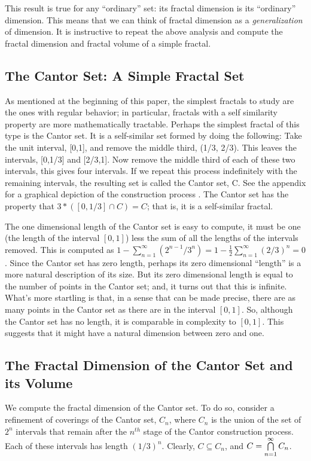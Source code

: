 {This result is true for any ``ordinary'' set: its fractal dimension is its
``ordinary'' dimension. This means that we can think of fractal
dimension as a {\it generalization} of dimension. It is 
instructive to repeat the above analysis and compute the fractal dimension 
and fractal volume of a simple fractal.


\subsection{The Cantor Set: A Simple Fractal Set}

As mentioned at the beginning of this paper, the simplest fractals to
study are the ones with regular behavior; in particular, fractals with a
self similarity property are more mathematically tractable. Perhaps
the simplest fractal of this type is 
the Cantor set. It is a self-similar set formed by doing the following:
Take the unit interval, [0,1], and remove the middle third, (1/3,
2/3). This leaves the intervals, [0,1/3] and [2/3,1]. Now remove the
middle third of each of these two intervals, this gives four
intervals.
If we repeat this process indefinitely with the remaining
intervals, the resulting set is called the Cantor set, C. See 
the appendix for a graphical depiction of the construction process . 
The Cantor
set has the property that $3 * \left([0,1/3] \cap C\right) = C$; that is, 
it is a self-similar fractal. 

The one dimensional length of the Cantor set is
easy to compute, it must be one (the length of the interval $[0,1]$) 
less the sum of all the lengths of the
intervals removed. This is computed as $1
- \sum_{n=1}^\infty (2^{n-1}/3^n) = 1 - \frac{1}{2}
\sum_{n=1}^\infty (2/3)^n = 0$. Since the Cantor set has zero length,
perhaps its zero dimensional ``length'' is a more natural description
of its size. But its zero dimensional length is equal to the 
number of points in the Cantor set; and, it turns out that this is infinite. 
What's more startling is
that, in a sense that can be made precise, there are as many points in
the Cantor set as there are in the interval $[0,1]$. So, although the 
Cantor set has no length, it is comparable in complexity
to $[0,1]$. This suggests that it might have a natural dimension
between zero and one.

\subsection{The Fractal Dimension of the Cantor Set and its Volume}
We compute the fractal dimension of the Cantor set. To do so, 
consider a refinement of coverings of the Cantor set, $C_n$, where
$C_n$ is the union of the set of $2^n$ intervals that remain after 
the $n^{th}$ stage of the Cantor construction process. Each of these 
intervals has length $(1/3)^n$. 
Clearly, $C \subseteq C_n$, and $C = \bigcap_{n=1}^\infty\limits C_n$. 

}
